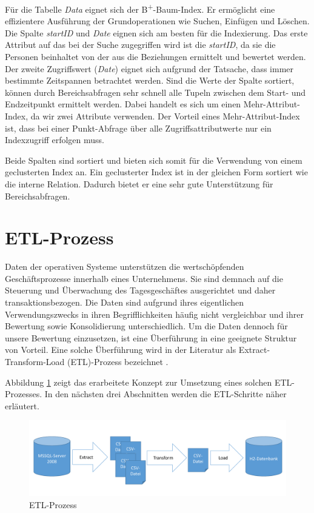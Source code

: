 Für die Tabelle \textit{Data} eignet sich der B\textsuperscript{+}-Baum-Index. Er ermöglicht eine effizientere Ausführung der Grundoperationen wie Suchen, Einfügen und Löschen. Die Spalte \textit{startID} und \textit{Date} eignen sich am besten für die Indexierung. Das erste Attribut auf das bei der Suche zugegriffen wird ist die \textit{startID}, da sie die Personen beinhaltet von der aus die Beziehungen ermittelt und bewertet werden. Der zweite Zugriffswert (\textit{Date}) eignet sich aufgrund der Tatsache, dass immer bestimmte Zeitspannen betrachtet werden. Sind die Werte der Spalte sortiert, können durch Bereichsabfragen sehr schnell alle Tupeln zwischen dem Start- und Endzeitpunkt ermittelt werden. Dabei handelt es sich um einen Mehr-Attribut-Index, da wir zwei Attribute verwenden. Der Vorteil eines Mehr-Attribut-Index ist, dass bei einer Punkt-Abfrage über alle Zugriffsattributwerte nur ein Indexzugriff erfolgen muss.

Beide Spalten sind sortiert und bieten sich somit für die Verwendung von einem geclusterten Index an. Ein geclusterter Index ist in der gleichen Form sortiert wie die interne Relation. Dadurch bietet er eine sehr gute Unterstützung für Bereichsabfragen.


\section{ETL-Prozess}
\label{ch:konzeption:etl}

Daten der operativen Systeme unterstützen die wertschöpfenden Geschäftsprozesse innerhalb eines Unternehmens. Sie sind demnach auf die Steuerung und Überwachung des Tagesgeschäftes ausgerichtet und daher transaktionsbezogen. Die Daten sind aufgrund ihres eigentlichen Verwendungszwecks in ihren Begrifflichkeiten häufig nicht vergleichbar und ihrer Bewertung sowie Konsolidierung unterschiedlich. Um die Daten dennoch für unsere Bewertung einzusetzen, ist eine Überführung in eine geeignete Struktur von Vorteil. Eine solche Überführung wird in der Literatur als Extract-Transform-Load (ETL)-Prozess bezeichnet \cite{ElSappagh201191}. 

Abbildung \ref{konzept:etl} zeigt das erarbeitete Konzept zur Umsetzung eines solchen ETL-Prozesses. In den nächsten drei Abschnitten werden die ETL-Schritte näher erläutert.

\begin{figure}[htbp]
\centering
  \includegraphics[width=1.0\textwidth, width=1.0\textwidth]{pics/ETL.pdf}
\caption{ETL-Prozess}
\label{konzept:etl}
\end{figure} 


